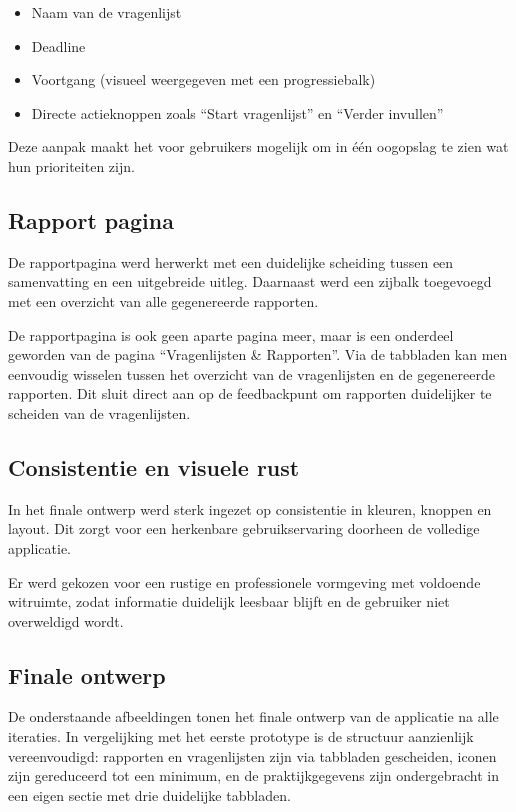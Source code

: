 \begin{itemize}
    \item Naam van de vragenlijst
    \item Deadline
    \item Voortgang (visueel weergegeven met een progressiebalk)
    \item Directe actieknoppen zoals ``Start vragenlijst'' en ``Verder invullen''
\end{itemize}
 
Deze aanpak maakt het voor gebruikers mogelijk om in één oogopslag te zien wat hun prioriteiten zijn.

\subsection{Rapport pagina}
\label{subsec:rapport}

De rapportpagina werd herwerkt met een duidelijke scheiding tussen een samenvatting en een uitgebreide uitleg.
Daarnaast werd een zijbalk toegevoegd met een overzicht van alle gegenereerde rapporten.
\medskip
 
De rapportpagina is ook geen aparte pagina meer, maar is een onderdeel geworden van de pagina ``Vragenlijsten \& Rapporten''.
Via de tabbladen kan men eenvoudig wisselen tussen het overzicht van de vragenlijsten en de gegenereerde rapporten. 
Dit sluit direct aan op de feedbackpunt om rapporten duidelijker te scheiden van de vragenlijsten.

\subsection{Consistentie en visuele rust}
\label{subsec:consistentie}

In het finale ontwerp werd sterk ingezet op consistentie in kleuren, knoppen en layout.
Dit zorgt voor een herkenbare gebruikservaring doorheen de volledige applicatie.
\medskip
 
Er werd gekozen voor een rustige en professionele vormgeving met voldoende witruimte, zodat informatie duidelijk leesbaar blijft en de gebruiker niet overweldigd wordt.

\subsection{Finale ontwerp}
\label{subsec:finaleontwerp}

De onderstaande afbeeldingen tonen het finale ontwerp van de applicatie na alle iteraties.
In vergelijking met het eerste prototype is de structuur aanzienlijk vereenvoudigd: rapporten en vragenlijsten zijn via tabbladen gescheiden, iconen zijn gereduceerd tot een minimum, en de praktijkgegevens zijn ondergebracht in een eigen sectie met drie duidelijke tabbladen.

